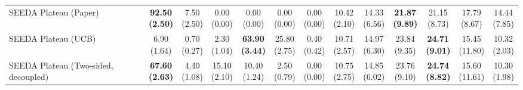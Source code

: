 \begin{table}[H]
{\begin{tabular}{l|cccccc|cccccc}
SEEDA Plateau (Paper) & \bfseries \makecell{92.50 \\ (2.50)} & \makecell{7.50 \\ (2.50)} & {\cellcolor[HTML]{C8E6C9}} \makecell{0.00 \\ (0.00)} & \makecell{0.00 \\ (0.00)} & \makecell{0.00 \\ (0.00)} & \makecell{0.00 \\ (0.00)} & \makecell{10.42 \\ (2.10)} & \makecell{14.33 \\ (6.56)} & {\cellcolor[HTML]{C8E6C9}} \bfseries \makecell{21.87 \\ (9.89)} & \makecell{21.15 \\ (8.73)} & \makecell{17.79 \\ (8.67)} & \makecell{14.44 \\ (7.85)} \\
SEEDA Plateau (UCB) & \makecell{6.90 \\ (1.64)} & \makecell{0.70 \\ (0.27)} & {\cellcolor[HTML]{C8E6C9}} \makecell{2.30 \\ (1.04)} & \bfseries \makecell{63.90 \\ (3.44)} & \makecell{25.80 \\ (2.75)} & \makecell{0.40 \\ (0.42)} & \makecell{10.71 \\ (2.57)} & \makecell{14.97 \\ (6.30)} & {\cellcolor[HTML]{C8E6C9}} \makecell{23.84 \\ (9.35)} & \bfseries \makecell{24.71 \\ (9.01)} & \makecell{15.45 \\ (11.80)} & \makecell{10.32 \\ (2.03)} \\
SEEDA Plateau (Two-sided, decoupled) & \bfseries \makecell{67.60 \\ (2.63)} & \makecell{4.40 \\ (1.08)} & {\cellcolor[HTML]{C8E6C9}} \makecell{15.10 \\ (2.10)} & \makecell{10.40 \\ (1.24)} & \makecell{2.50 \\ (0.79)} & \makecell{0.00 \\ (0.00)} & \makecell{10.75 \\ (2.75)} & \makecell{14.85 \\ (6.02)} & {\cellcolor[HTML]{C8E6C9}} \makecell{23.76 \\ (9.10)} & \bfseries \makecell{24.74 \\ (8.82)} & \makecell{15.60 \\ (11.61)} & \makecell{10.30 \\ (1.98)} \\

\end{tabular}}
\end{table}
